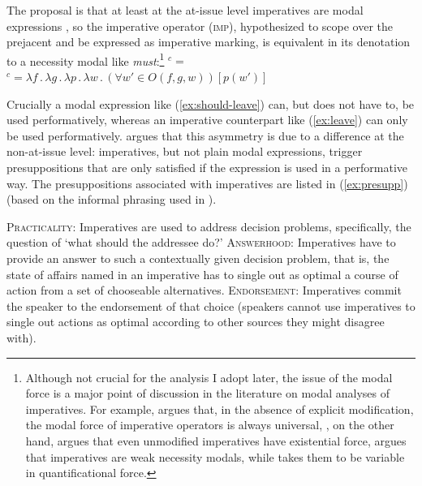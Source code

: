\documentclass[output=paper,colorlinks,citecolor=brown]{langscibook}
\begin{document}
\noindent The proposal is that at least at the at-issue level imperatives are modal expressions \citep[modeled in the approach of][]{kratzer81,Kratzer1991,kratzer12}, so the imperative operator (\textsc{imp}), hypothesized to scope over the prejacent and be expressed as imperative marking, is equivalent in its denotation to a necessity modal like \emph{must}:\footnote{Although not crucial for the analysis I adopt later, the issue of the modal force is a major point of discussion in the literature on modal analyses of imperatives. For example, \citet{kaufmannBOOK} argues that, in the absence of explicit modification, the modal force of imperative operators is always universal, \citet{oikonomou16}, on the other hand, argues that even unmodified imperatives have existential force, \citet{medeirosDISS} argues that imperatives are weak necessity modals, while \citet{grosz09nels} takes them to be variable in quantificational force.} 
\ea\label{ex:imp-op} $^c={}$$^c=\lambda f \,.\, \lambda g \,.\, \lambda p \,.\, \lambda w \,.\, (\forall w'\in O(f,g,w))[p(w')]$
\z\z

\noindent Crucially a modal expression like (\ref{ex:should-leave}) can, but does not have to, be used performatively, whereas an imperative counterpart like (\ref{ex:leave}) can only be used performatively. \textcite{kaufmannBOOK} argues that this asymmetry is due to a difference at the 
 non-at-issue level: imperatives, but not plain modal expressions, trigger presuppositions that are only satisfied if the expression is used in a performative way. The presuppositions associated with imperatives are listed in (\ref{ex:presupp}) (based on the informal phrasing used in \cite{kaufmannstegovec19}).
 
\eanoraggedright \label{ex:presupp}
\eanoraggedright {}\textsc{Practicality:} Imperatives are used to address decision problems, spe\-cifically, the
question of `what should the addressee do?'
\ex {}\textsc{Answerhood:} Imperatives have to provide an answer to such a contextually given decision problem, that is, the state of affairs named in an imperative has to single out as optimal a course of action from a set of chooseable alternatives.
\ex {}\textsc{Endorsement:} Imperatives commit the speaker to the endorsement of that choice (speakers cannot use imperatives to single out actions as optimal according to other sources they might disagree with).
\z\z  
\end{document}
